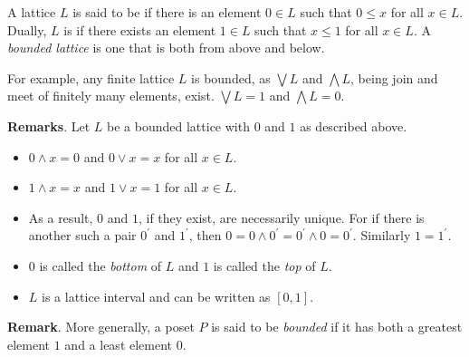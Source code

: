 \documentclass[12pt]{article}
\begin{document}
A lattice $L$ is said to be \emph{} if there is an element $0\in L$ such that $0\leq x$ for all $x\in L$.  Dually, $L$ is \emph{} if there exists an element $1\in L$ such that $x\leq1$ for all $x\in L$.  A \emph{bounded lattice} is one that is  both from above and below.

For example, any finite lattice $L$ is bounded, as $\bigvee L$ and $\bigwedge L$, being join and meet of finitely many elements, exist.  $\bigvee L=1$ and $\bigwedge L=0$.

\textbf{Remarks}.
Let $L$ be a bounded lattice with $0$ and $1$ as described above.
\begin{itemize}
\item $0\land x=0$ and $0\lor x=x$ for all $x\in L$.
\item $1\land x=x$ and $1\lor x=1$ for all $x\in L$.
\item As a result, $0$ and $1$, if they exist, are necessarily unique.  For
if there is another such a pair $0^{\prime}$ and $1^{\prime}$, then
$0=0\land 0^{\prime}=0^{\prime}\land 0=0^{\prime}$.  Similarly
$1=1^{\prime}$.
\item $0$ is called the \emph{bottom} of $L$ and $1$ is called the \emph{top} of $L$.
\item $L$ is a lattice interval and can be written as $[0,1]$.
\end{itemize}

\textbf{Remark}.  More generally, a poset $P$ is said to be \emph{bounded} if it has both a greatest element $1$ and a least element $0$.
\end{document}
